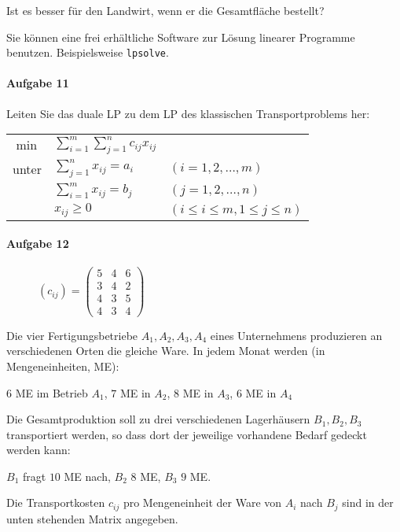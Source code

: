 \documentclass[
a4paper, %
11pt,
]
{scrartcl}
\begin{document}
Ist es besser für den Landwirt, wenn er die Gesamtfläche bestellt?

Sie können eine frei erhältliche Software zur Lösung linearer Programme
benutzen. Beispielsweise \texttt{lpsolve}.

\paragraph{Aufgabe 11}%
\label{par:aufgabe_11}

Leiten Sie das duale LP zu dem LP des klassischen Transportproblems her:

\begin{tabular}{lll}
  $\min$ & $\sum\limits_{i=1}^m \sum\limits_{j=1}^n c_{ij} x_{ij}$\\
  unter & $\sum\limits_{j=1}^n x_{ij} = a_i$ & $(i = 1,2, \ldots, m)$\\
  & $\sum\limits_{i=1}^m x_{ij} = b_j$ & $(j = 1,2, \ldots, n)$\\
  & $x_{ij} \geq 0$ & $(i \leq i \leq m, 1 \leq j \leq n)$
\end{tabular}

\paragraph{Aufgabe 12}%
\label{par:aufgabe_12}
\begin{wrapfigure}{r}{0.2\textwidth}
  $(c_{ij})  =
  \begin{pmatrix}
    5 & 4 & 6\\
    3 & 4 & 2\\
    4 & 3 & 5\\
    4 & 3 & 4
  \end{pmatrix}$
\end{wrapfigure}
Die vier Fertigungsbetriebe $A_1, A_2, A_3, A_4$ eines Unternehmens produzieren
an verschiedenen Orten die gleiche Ware. In jedem Monat werden (in
Mengeneinheiten, ME):
\begin{addmargin}[1cm]{0cm}
  $6$ ME im Betrieb $A_1$, $7$ ME in $A_2$, $8$ ME in $A_3$, $6$ ME in $A_4$
\end{addmargin}
Die Gesamtproduktion soll zu drei verschiedenen Lagerhäusern $B_1, B_2, B_3$
transportiert werden, so dass dort der jeweilige vorhandene Bedarf gedeckt
werden kann:
\begin{addmargin}[1cm]{0cm}
  $B_1$ fragt $10$ ME nach, $B_2$ $8$ ME, $B_3$ $9$ ME.
\end{addmargin}
Die Transportkosten $c_{ij}$ pro Mengeneinheit der Ware von $A_i$ nach $B_j$
sind in der unten stehenden Matrix angegeben.
\end{document}
